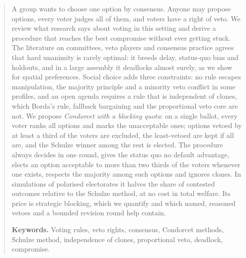 \begin{abstract}
A group wants to choose one option by consensus. Anyone may propose options, every voter judges all of
them, and voters have a right of veto. We review what research says about voting in this setting and
derive a procedure that reaches the best compromise without ever getting stuck. The literature on
committees, veto players and consensus practice agrees that hard unanimity is rarely optimal: it breeds
delay, status-quo bias and holdouts, and in a large assembly it deadlocks almost surely, as we show for
spatial preferences. Social choice adds three constraints: no rule escapes manipulation, the majority
principle and a minority veto conflict in some profiles, and an open agenda requires a rule that is
independent of clones, which Borda's rule, fallback bargaining and the proportional veto core are not. We
propose \emph{Condorcet with a blocking quota}: on a single ballot, every voter ranks all options and marks
the unacceptable ones; options vetoed by at least a third of the voters are excluded, the least-vetoed are
kept if all are, and the Schulze winner among the rest is elected. The procedure always decides in one
round, gives the status quo no default advantage, elects an option acceptable to more than two thirds of
the voters whenever one exists, respects the majority among such options and ignores clones. In
simulations of polarised electorates it halves the share of contested outcomes relative to the Schulze
method, at no cost in total welfare. Its price is strategic blocking, which we quantify and which named,
reasoned vetoes and a bounded revision round help contain.

\medskip
\noindent\textbf{Keywords.} Voting rules, veto rights, consensus, Condorcet methods, Schulze method,
independence of clones, proportional veto, deadlock, compromise.
\end{abstract}

